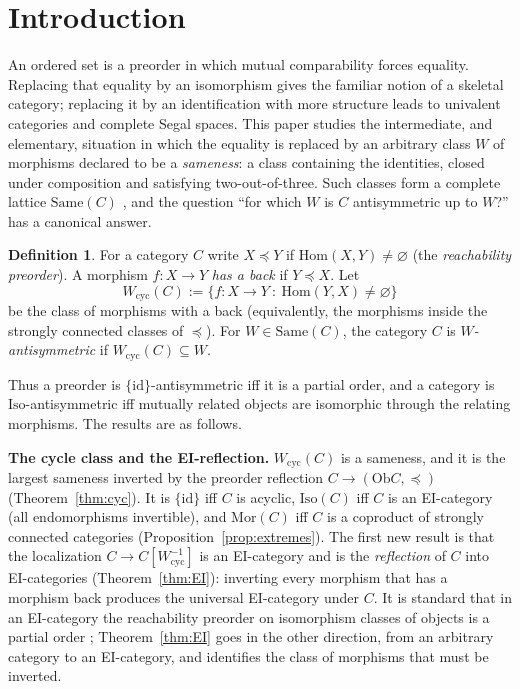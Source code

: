 \documentclass[11pt]{amsart}
\theoremstyle{definition}
\newtheorem{defi}[thm]{Definition}
\newcommand{\Same}{\mathrm{Same}}
\newcommand{\Mor}{\mathrm{Mor}}
\newcommand{\Iso}{\mathrm{Iso}}
\newcommand{\Hom}{\mathrm{Hom}}
\newcommand{\Ob}{\mathrm{Ob}}
\newcommand{\Wcyc}{W_{\mathrm{cyc}}}
\begin{document}
\section{Introduction}

An ordered set is a preorder in which mutual comparability forces equality.
Replacing that equality by an isomorphism gives the familiar notion of a
skeletal category; replacing it by an identification with more structure
leads to univalent categories and complete Segal spaces. This paper studies
the intermediate, and elementary, situation in which the equality is
replaced by an arbitrary class $W$ of morphisms declared to be a
\emph{sameness}: a class containing the identities, closed under
composition and satisfying two-out-of-three. Such classes form a complete
lattice $\Same(C)$ \cite{Same}, and the question ``for which $W$ is $C$
antisymmetric up to $W$?'' has a canonical answer.

\begin{defi}\label{def:cyc}
For a category $C$ write $X\preceq Y$ if $\Hom(X,Y)\neq\varnothing$ (the
\emph{reachability preorder}). A morphism $f\colon X\to Y$ \emph{has a back}
if $Y\preceq X$. Let
\[
\Wcyc(C):=\{f\colon X\to Y\ :\ \Hom(Y,X)\neq\varnothing\}
\]
be the class of morphisms with a back (equivalently, the morphisms inside
the strongly connected classes of $\preceq$). For $W\in\Same(C)$, the
category $C$ is \emph{$W$-antisymmetric} if $\Wcyc(C)\subseteq W$.
\end{defi}

Thus a preorder is $\{\mathrm{id}\}$-antisymmetric iff it is a partial order,
and a category is $\Iso$-antisymmetric iff mutually related objects are
isomorphic through the relating morphisms. The results are as follows.

\medskip\noindent\textbf{The cycle class and the EI-reflection.} $\Wcyc(C)$
is a sameness, and it is the largest sameness inverted by the preorder
reflection $C\to(\Ob C,\preceq)$ (Theorem~\ref{thm:cyc}). It is $\{\mathrm{id}\}$
iff $C$ is acyclic, $\Iso(C)$ iff $C$ is an EI-category (all endomorphisms
invertible), and $\Mor(C)$ iff $C$ is a coproduct of strongly connected
categories (Proposition~\ref{prop:extremes}). The first new result is that
the localization $C\to C[\Wcyc^{-1}]$ is an EI-category and is the
\emph{reflection} of $C$ into EI-categories (Theorem~\ref{thm:EI}): inverting
every morphism that has a morphism back produces the universal EI-category
under $C$. It is standard that in an EI-category the reachability
preorder on isomorphism classes of objects is a partial order
\cite[\S9]{Lueck}; Theorem~\ref{thm:EI} goes in the other direction, from an
arbitrary category to an EI-category, and identifies the class of
morphisms that must be inverted.
\end{document}

